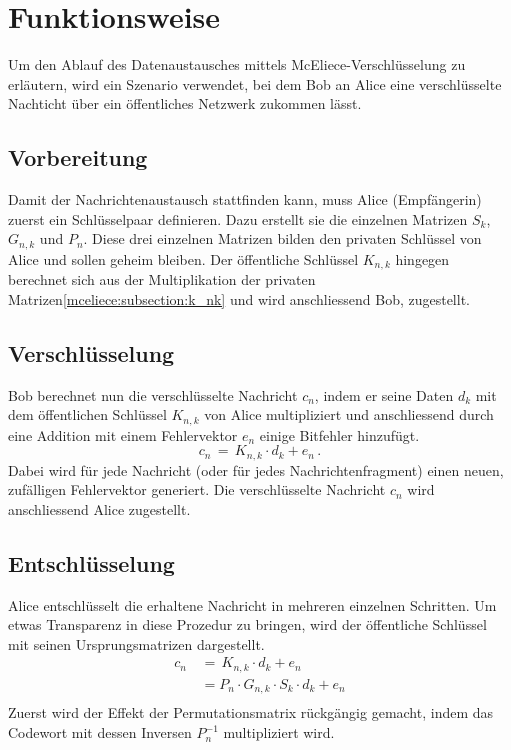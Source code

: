 %
%
%
\section{Funktionsweise 
\label{mceliece:section:funktionsweise}}
Um den Ablauf des Datenaustausches mittels McEliece-Verschlüsselung zu erläutern,
wird ein Szenario verwendet,
bei dem Bob an Alice eine verschlüsselte Nachticht über ein öffentliches Netzwerk zukommen lässt.

\subsection{Vorbereitung
\label{mceliece:section:vorbereitung}}
Damit der Nachrichtenaustausch stattfinden kann, muss Alice (Empfängerin)
zuerst ein Schlüsselpaar definieren.
Dazu erstellt sie die einzelnen Matrizen $S_k$, $G_{n,k}$ und $P_n$.
Diese drei einzelnen Matrizen bilden den privaten Schlüssel von Alice
und sollen geheim bleiben.
Der öffentliche Schlüssel $K_{n,k}$ hingegen berechnet sich
aus der Multiplikation der privaten Matrizen\ref{mceliece:subsection:k_nk}
und wird anschliessend Bob, zugestellt.

\subsection{Verschlüsselung
\label{mceliece:section:verschl}}
Bob berechnet nun die verschlüsselte Nachricht $c_n$, indem er seine Daten $d_k$
mit dem öffentlichen Schlüssel $K_{n,k}$ von Alice multipliziert
und anschliessend durch eine Addition mit einem Fehlervektor $e_n$ einige Bitfehler hinzufügt.
\[
    c_n\,=\,K_{n,k}\cdot d_k + e_n\,.
\]
Dabei wird für jede Nachricht (oder für jedes Nachrichtenfragment)
einen neuen, zufälligen Fehlervektor generiert.
Die verschlüsselte Nachricht $c_n$ wird anschliessend Alice zugestellt.

\subsection{Entschlüsselung
\label{mceliece:section:entschl}}
Alice entschlüsselt die erhaltene Nachricht in mehreren einzelnen Schritten.
Um etwas Transparenz in diese Prozedur zu bringen, wird der öffentliche Schlüssel mit seinen Ursprungsmatrizen dargestellt.
\[
    \begin{align*}​
        c_n\,&=\,K_{n,k}\cdot d_k + e_n \\​
             &= P_{n}\cdot G_{n,k}\cdot S_{k}\cdot d_k + e_n \\​
    \end{align*}​
\]
Zuerst wird der Effekt der Permutationsmatrix rückgängig gemacht,
indem das Codewort mit dessen Inversen $P_n^{-1}​$ multipliziert wird.

